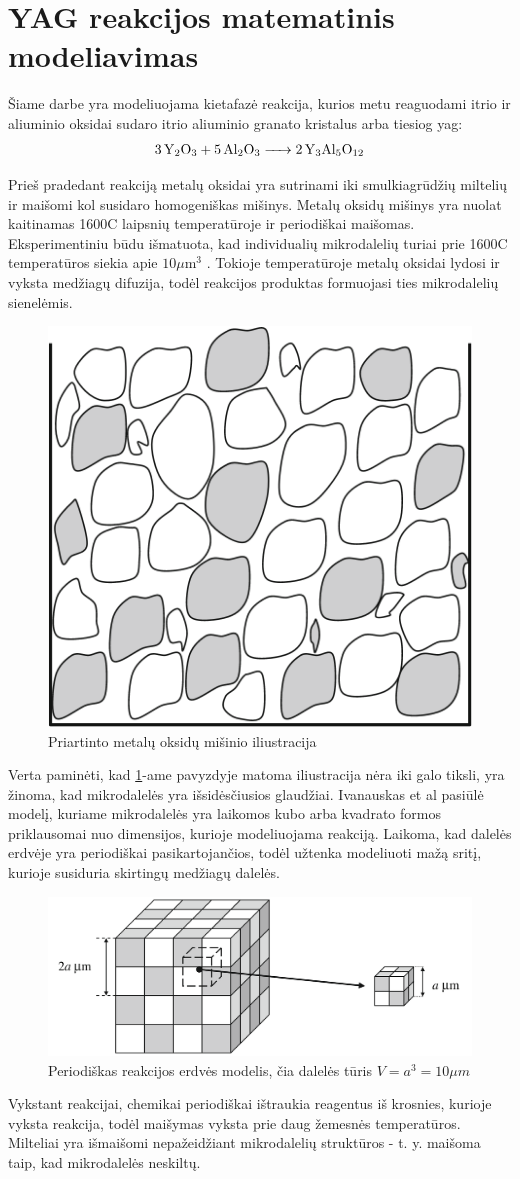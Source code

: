 \section{YAG reakcijos matematinis modeliavimas}

Šiame darbe yra modeliuojama kietafazė reakcija, kurios metu reaguodami itrio ir aliuminio oksidai sudaro itrio aliuminio granato kristalus arba tiesiog \acs{yag}:
\begin{align*}
  \ce{3Y_2O_3 + 5Al_2O_3 -> 2Y_3Al_5O_12}
\end{align*}

Prieš pradedant reakciją metalų oksidai yra sutrinami iki smulkiagrūdžių miltelių ir maišomi kol susidaro homogeniškas mišinys. Metalų oksidų mišinys yra nuolat kaitinamas 1600\degree C laipsnių temperatūroje ir periodiškai maišomas. Eksperimentiniu būdu išmatuota, kad individualių mikrodalelių turiai prie 1600\degree C temperatūros siekia apie $10\mu\text{m}^3$ \cite{ivanauskasComputationalModellingYAG2009}. Tokioje temperatūroje metalų oksidai lydosi ir vyksta medžiagų difuzija, todėl reakcijos produktas formuojasi ties mikrodalelių sienelėmis.

\begin{figure}[h]
  \centering
  \includegraphics[width=0.25\linewidth]{assets/metal_oxides_mixture.png}
  \caption{Priartinto metalų oksidų mišinio iliustracija \cite{ivanauskasComputationalModellingYAG2009}}
  \label{fig:metal-oxides-mixuter}
\end{figure}

Verta paminėti, kad \ref{fig:metal-oxides-mixuter}-ame pavyzdyje matoma iliustracija nėra iki galo tiksli, yra žinoma, kad mikrodalelės yra išsidėsčiusios glaudžiai.
\cite{ivanauskasModellingSolidState2005} Ivanauskas et al pasiūlė modelį, kuriame mikrodalelės yra laikomos kubo arba kvadrato formos priklausomai nuo dimensijos, kurioje modeliuojama reakciją. Laikoma, kad dalelės erdvėje yra periodiškai pasikartojančios, todėl užtenka modeliuoti mažą sritį, kurioje susiduria skirtingų medžiagų dalelės. 

\begin{figure}[h]
  \centering
  \includegraphics[width=0.75\linewidth]{assets/periodic-space.png}
  \caption{Periodiškas reakcijos erdvės modelis, čia dalelės tūris $V=a^3=10\mu m$ \cite{ivanauskasComputationalModellingYAG2009}}
  \label{fig:periodic-space}
\end{figure}

Vykstant reakcijai, chemikai periodiškai ištraukia reagentus iš krosnies, kurioje vyksta reakcija, todėl maišymas vyksta prie daug žemesnės temperatūros. Milteliai yra išmaišomi nepažeidžiant mikrodalelių struktūros - t. y. maišoma taip, kad mikrodalelės neskiltų.
